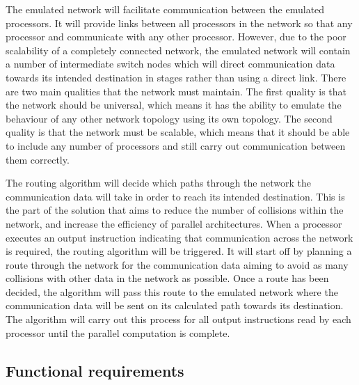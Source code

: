\documentclass[a4paper, 12pt]{article}
\begin{document}
The emulated network will facilitate communication between the emulated processors. It will provide links between all processors in the network so that any processor and communicate with any other processor. However, due to the poor scalability of a completely connected network, the emulated network will contain a number of intermediate switch nodes which will direct communication data towards its intended destination in stages rather than using a direct link. There are two main qualities that the network must maintain. The first quality is that the network should be universal, which means it has the ability to emulate the behaviour of any other network topology using its own topology. The second quality is that the network must be scalable, which means that it should be able to include any number of processors and still carry out communication between them correctly.

The routing algorithm will decide which paths through the network the communication data will take in order to reach its intended destination. This is the part of the solution that aims to reduce the number of collisions within the network, and increase the efficiency of parallel architectures. When a processor executes an output instruction indicating that communication across the network is required, the routing algorithm will be triggered. It will start off by planning a route through the network for the communication data aiming to avoid as many collisions with other data in the network as possible. Once a route has been decided, the algorithm will pass this route to the emulated network where the communication data will be sent on its calculated path towards its destination. The algorithm will carry out this process for all output instructions read by each processor until the parallel computation is complete.

\subsection{Functional requirements}
\end{document}
